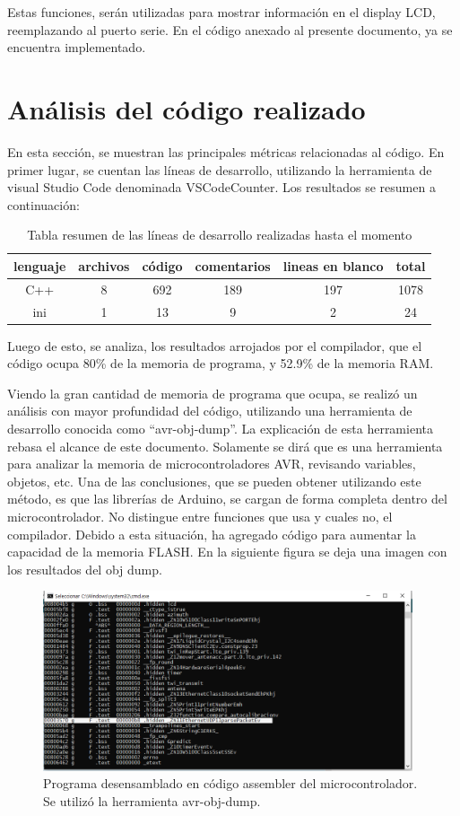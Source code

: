 Estas funciones, serán utilizadas para mostrar información en el display LCD, reemplazando al puerto serie. En el código anexado al presente documento, ya se encuentra implementado. 



\section{Análisis del código realizado}

En esta sección, se muestran las principales métricas relacionadas al código. 
En primer lugar, se cuentan las líneas de desarrollo, utilizando la herramienta de visual Studio Code denominada VSCodeCounter. Los resultados se resumen a continuación: 

\begin{table}[ht]
	\centering
	\begin{tabular}{|c|c|c|c|c|c|}
		\hline 
		lenguaje& archivos & código & comentarios & lineas en blanco & total \\ 
		\hline 
		C++ & 8 &692 &189 &197 & 1078 \\
		\hline 
		ini &1 &13 &9 &2&24\\
		\hline
	\end{tabular}
	\caption{Tabla resumen de las líneas de desarrollo realizadas hasta el momento}
\end{table}
\vspace{-5mm}
Luego de esto, se analiza, los resultados arrojados por el compilador, que el código ocupa 80\% de la memoria de programa, y 52.9\% de la memoria RAM. 

Viendo la gran cantidad de memoria de programa que ocupa, se realizó un análisis con mayor profundidad del código, utilizando una herramienta de desarrollo conocida como ``avr-obj-dump''. La explicación de esta herramienta rebasa el alcance de este documento. Solamente se dirá que es una herramienta para analizar la memoria de microcontroladores AVR, revisando variables, objetos, etc. Una de las conclusiones, que se pueden obtener utilizando este método, es que las librerías de Arduino, se cargan de forma completa dentro del microcontrolador. No distingue entre funciones que usa y cuales no, el compilador. Debido a esta situación,  ha agregado código para aumentar la capacidad de la memoria FLASH. En la siguiente figura se deja una imagen con los resultados del obj dump.  

\begin{figure}[ht!]	
	\includegraphics[width=\linewidth,height=5.3cm]{dump_memory}
	\caption{Programa desensamblado en código assembler del microcontrolador. Se utilizó la herramienta avr-obj-dump. }
	\label{fig:avr_obj_dump}
\end{figure}


